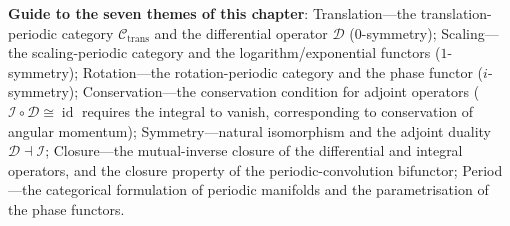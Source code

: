 \begin{remark}
\textbf{Guide to the seven themes of this chapter}: Translation---the translation-periodic category $\mathcal{C}_{\text{trans}}$ and the differential operator $\mathcal{D}$ ($0$-symmetry); Scaling---the scaling-periodic category and the logarithm/exponential functors ($1$-symmetry); Rotation---the rotation-periodic category and the phase functor ($i$-symmetry); Conservation---the conservation condition for adjoint operators ($\mathcal{I}\circ\mathcal{D}\cong\operatorname{id}$ requires the integral to vanish, corresponding to conservation of angular momentum); Symmetry---natural isomorphism and the adjoint duality $\mathcal{D}\dashv\mathcal{I}$; Closure---the mutual-inverse closure of the differential and integral operators, and the closure property of the periodic-convolution bifunctor; Period---the categorical formulation of periodic manifolds and the parametrisation of the phase functors.
\end{remark}

